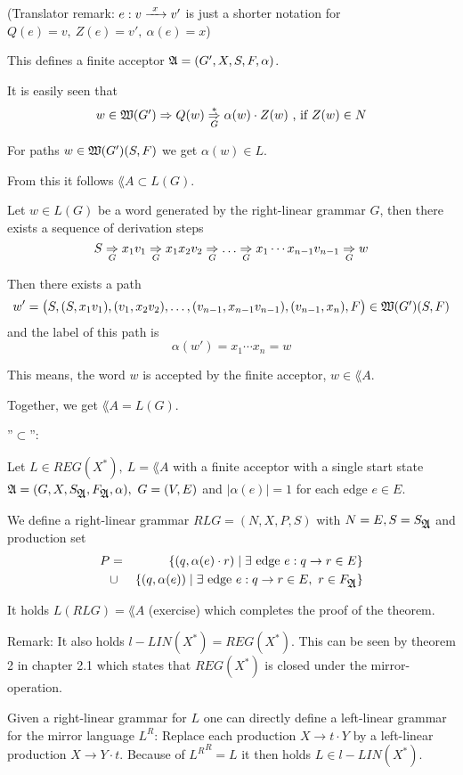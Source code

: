 (Translator remark: $e: v \xrightarrow{\ {x}\ } v'$ is just a shorter notation for $Q(e) =
v, \ Z(e) = v',\ \alpha(e) = x$)

This defines a finite acceptor $\mbox{$\mathfrak{A}$} = (G', X, S, F, \alpha)$.

It is easily seen that
\[ w \in \mbox{$\mathfrak{W}(G')$} \Rightarrow Q(w) \underset{G}{\overset{*}{\Rightarrow}} \alpha(w) \cdot Z(w) \mbox{
 , if } Z(w) \in N\]

For paths $w \in \mbox{$\mathfrak{W}(G')$}(S, F)$ we get $\alpha(w) \in L$.

From this it follows $\lang{A} \subset L(G)$.

Let $w \in L(G)$ be a word generated by the right-linear grammar $G$, then there
exists a sequence of derivation steps
\[ S \underset{G}{\Rightarrow} x_1 v_1 \underset{G}{\Rightarrow} x_1 x_2 v_2 \underset{G}{\Rightarrow} \ldots
\underset{G}{\Rightarrow} x_1 \cdots x_{n-1} v_{n-1} \underset{G}{\Rightarrow} w \]

Then there exists a path 
\[ w' = \big(S, (S,x_1 v_1), (v_1, x_2 v_2), \ldots, (v_{n-1}, x_{n-1} v_{n-1}),
(v_{n-1}, x_n), F\big) \in \mbox{$\mathfrak{W}(G')$}(S, F) \]
and the label of this path is
\[ \alpha(w') = x_1 \cdots x_n = w \]

This means, the word $w$ is accepted by the finite acceptor, $w \in \lang{A}$.

Together, we get $\lang{A} = L(G)$.

''$\subset$'':

Let $L \in REG(X^*),\ L = \lang{A}$ with a finite acceptor with a single start
state $\mbox{$\mathfrak{A}$} = (G, X, S_{\mbox{$\mathfrak{A}$}}, F_{\mbox{$\mathfrak{A}$}}, \alpha),\ G = (V, E)$ 
and $|\alpha(e)| = 1$ for each edge $e \in E$.

We define a right-linear grammar $RLG = (N, X, P, S)$ with $N = E, S =
S_{\mbox{$\mathfrak{A}$}}$ and production set
\begin{eqnarray*}
P & = & \{ (q, \alpha(e) \cdot r) \mid \exists \mbox{ edge } e : q \to r \in E
\} \\
& \cup & \{ (q, \alpha(e)) \mid \exists \mbox{ edge } e : q \to r \in E,\ r \in
F_{\mbox{$\mathfrak{A}$}} \}
\end{eqnarray*}

It holds $L(RLG) = \lang{A}$ (exercise) which completes the proof of the
theorem.

Remark: It also holds $l{-}LIN(X^*) = REG(X^*)$. This can be seen by theorem 2
in chapter 2.1 which states that $REG(X^*)$ is closed under the
mirror-operation.

Given a right-linear grammar for $L$ one can directly define a left-linear
grammar for the mirror language $L^R$: Replace each production $X \to t \cdot Y$
by a left-linear production $X \to Y \cdot t$. Because of ${L^R}^R = L$ it then
holds $L \in l{-}LIN(X^*)$.

